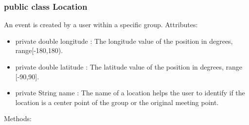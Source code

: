 	\subsubsection{public class Location}
	An event is created by a user within a specific group.
	\newline Attributes:
	\begin{itemize}
	\item private  double longitude : The longitude value of the position in degrees, range[-180,180). 
	\item private  double latitude : The latitude value of the position in degrees, range [-90,90].
	\item private String name : The name of a location helps the user to identify if the location is a center point of the group or the original meeting point.
	\end{itemize}
	Methods:
